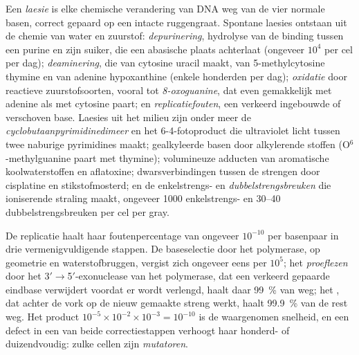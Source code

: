 \begin{definition}\label{def:b3:dna-repair:lesions}
Een \emph{laesie} is elke chemische verandering van DNA weg van de vier
normale basen, correct gepaard op een intacte ruggengraat. Spontane
laesies ontstaan uit de chemie van water en zuurstof:
\emph{depurinering}, hydrolyse van de binding tussen een purine en
zijn suiker, die een abasische plaats achterlaat (ongeveer $10^{4}$
per cel per dag); \emph{deaminering}, die van cytosine uracil maakt,
van 5-methylcytosine thymine en van adenine hypoxanthine (enkele
honderden per dag); \emph{oxidatie} door reactieve zuurstofsoorten,
vooral tot \emph{8-oxoguanine}, dat even gemakkelijk met adenine als
met cytosine paart; en \emph{replicatiefouten}, een verkeerd ingebouwde
of verschoven base. Laesies uit het milieu zijn onder meer de
\emph{cyclobutaanpyrimidinedimeer} en het 6-4-fotoproduct die
ultraviolet licht tussen twee naburige pyrimidines maakt;
gealkyleerde basen door alkylerende stoffen (O$^{6}$-methylguanine
paart met thymine); volumineuze adducten van aromatische
koolwaterstoffen en aflatoxine; dwarsverbindingen tussen de strengen
door cisplatine en stikstofmosterd; en de enkelstrengs- en
\emph{dubbelstrengsbreuken} die ioniserende straling maakt, ongeveer
\num{1000} enkelstrengs- en \numrange{30}{40} dubbelstrengsbreuken per
cel per gray.
\end{definition}

\begin{proposition}[De getrouwheidsladder]\label{prop:b3:dna-repair:fidelity}
De replicatie haalt haar foutenpercentage van ongeveer $10^{-10}$ per
basenpaar in drie vermenigvuldigende stappen. De baseselectie door het
polymerase, op geometrie en waterstofbruggen, vergist zich ongeveer
eens per $10^{5}$; het \emph{proeflezen} door het 3$'\to$5$'$-exonuclease
van het polymerase, dat een verkeerd gepaarde eindbase verwijdert
voordat er wordt verlengd, haalt daar \qty{99}{\%} van weg; het
\emph{}, dat achter de vork op de nieuw gemaakte streng
werkt, haalt \qty{99.9}{\%} van de rest weg. Het product
$10^{-5}\times 10^{-2}\times 10^{-3} = 10^{-10}$ is de waargenomen
snelheid, en een defect in een van beide correctiestappen verhoogt haar
honderd- of duizendvoudig: zulke cellen zijn \emph{mutatoren}.
\end{proposition}

